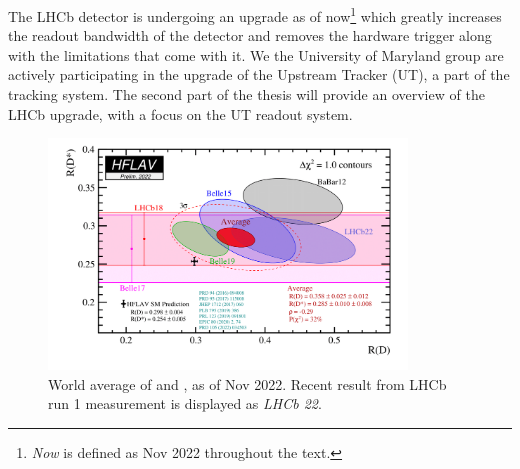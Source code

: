 The LHCb detector is undergoing an upgrade as of now\footnote{
    \emph{Now} is defined as Nov 2022 throughout the text.
} which greatly increases
the readout bandwidth of the detector and removes the hardware trigger along
with the limitations that come with it.
We the University of Maryland group are actively participating in the upgrade
of the Upstream Tracker (UT), a part of the tracking system.
The second part of the thesis will provide an overview of the LHCb upgrade, with
a focus on the UT readout system.

\begin{figure}[htb]
    \centering
    \includegraphics[width=0.85\textwidth]{./figs-intro/hflav_2022_preliminary.png}
    \caption{
        World average of \RD and \RDst, as of Nov 2022.
        Recent result from LHCb run 1 measurement is displayed as
        \emph{LHCb 22}.
    }
    \label{fig:hflav}
\end{figure}
